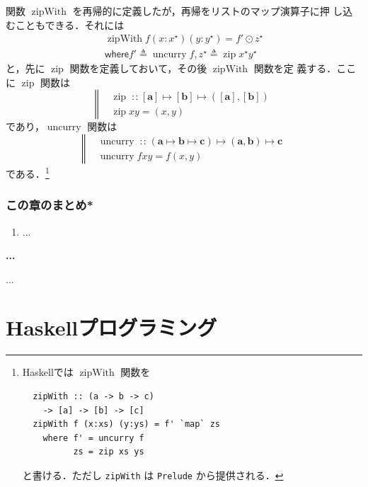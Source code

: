 \documentclass[a5paper,twoside,fleqn]{jsbook}
\newcommand{\programminglanguage}[1]{\textsf{#1}}
\newcommand{\haskell}{\programminglanguage{Haskell}}
\newenvironment{note}[1]{\begin{boxnote}\begin{center}\textbf{#1}\end{center}}{\end{boxnote}}
\newcommand{\code}[1]{\texttt{#1}}
\newcommand{\filename}[1]{\texttt{#1}}
\newcommand{\mBrace}{\Vert}
\newcommand{\mKeyword}[1]{\mathsf{#1}} %
\newcommand{\mWhereKeyword}{\mKeyword{where}}
\newcommand{\mSpecialFunc}[1]{\mathrm{#1}}
\DeclareMathOperator{\mUncurry}{\mSpecialFunc{uncurry}}
\DeclareMathOperator{\mZipFunc}{\mSpecialFunc{zip}}
\DeclareMathOperator{\mZipWith}{\mSpecialFunc{zipWith}}
\DeclareMathOperator{\mIn}{{:\!:}}
\DeclareMathOperator{\mLetEq}{\triangleq}
\DeclareMathOperator{\mMapList}{\odot}
\DeclareMathOperator{\mMapsTo}{\mapsto}
\newcommand{\mType}[1]{\mathbf{#1}}
\newcommand{\mListType}[1]{[\mType{#1}]}
\newcommand{\mTupleWith}[1]{\left(#1\right)}
\newcommand{\mList}[1]{{#1}^\mathrm{\star}}
\newcommand{\mProj}[2]{#1\mMapsTo#2}
\newcommand{\mWhereIsII}[4]{\mathbin{\mWhereKeyword}#1\mLetEq#2,#3\mLetEq#4}
\begin{document}
関数 $\mZipWith$ を再帰的に定義したが，再帰をリストのマップ演算子に押
し込むこともできる．それには
\begin{multline}
\mZipWith f(x:\mList{x})(y:\mList{y})=f'\mMapList\mList{z}\\
\mWhereIsII{f'}{\mUncurry f}{\mList{z}}{\mZipFunc\mList{x}\mList{y}}
\end{multline}
と，先に $\mZipFunc$ 関数を定義しておいて，その後 $\mZipWith$ 関数を定
義する．ここに $\mZipFunc$ 関数は
\begin{equation}
  \left\mBrace
  \begin{aligned}
    {}&\mZipFunc\mIn{}\mProj{\mListType{a}}
    {\mProj{\mListType{b}}
      {\mTupleWith{\mListType{a},\mListType{b}}}}\\
    {}&\mZipFunc xy=\mTupleWith{x,y}
  \end{aligned}
  \right.
\end{equation}
であり，$\mUncurry$ 関数は
\begin{equation}
  \left\mBrace
  \begin{aligned}
    {}&\mUncurry\mIn{}
    \mProj{(\mProj{\mType{a}}{\mProj{\mType{b}}{\mType{c}}})}
          {\mProj{\mTupleWith{\mType{a},\mType{b}}}{\mType{c}}}\\
          {}&\mUncurry fxy=f\mTupleWith{x,y}
  \end{aligned}
  \right.
\end{equation}
である．\footnote{\haskell では $\mZipWith$ 関数を
\begin{verbatim}
  zipWith :: (a -> b -> c)
    -> [a] -> [b] -> [c]
  zipWith f (x:xs) (y:ys) = f' `map` zs
    where f' = uncurry f
          zs = zip xs ys
\end{verbatim}
と書ける．ただし \code{zipWith} は \filename{Prelude} から提供される．}


\section{この章のまとめ*}

\begin{enumerate}
\item ...
\end{enumerate}

\begin{note}{...}
...
\end{note}


\part{\haskell プログラミング}
\end{document}
